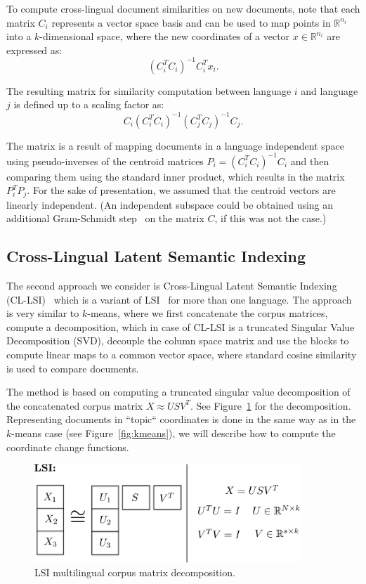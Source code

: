 \documentclass[twoside,11pt]{article}
\newcommand{\RR}{\mathbb{R}}
\begin{document}
To compute  cross-lingual document similarities on new documents, note that each matrix $C_i$ represents a vector space basis and can be used to map points in $\RR^{n_i}$ into a $k$-dimensional space, where the new coordinates of a vector $x \in \RR^{n_i}$ are expressed as: $$(C_i^T C_i)^{-1} C_i^T x_i.$$

The resulting matrix for similarity computation between language $i$ and language $j$ is defined up to a scaling factor as:
$$C_i(C_i^T C_i)^{-1} (C_j^T C_j)^{-1} C_j.$$

The matrix is a result of mapping documents in a language independent space using pseudo-inverses of the centroid matrices $P_i = (C_i^T C_i)^{-1} C_i$ and then comparing them using the standard inner product, which results in the matrix $P_i^T P_j$. For the sake of presentation, we assumed that the centroid vectors are linearly independent. (An independent subspace could be obtained using an additional Gram-Schmidt step~\cite{golub} on the matrix $C$, if this was not the case.)

\subsection{Cross-Lingual Latent Semantic Indexing}\label{sec:LSI}

The second approach we consider is Cross-Lingual Latent Semantic Indexing (CL-LSI)~\cite{cl_lsi} which is a variant of LSI~ for more than one language. The approach is very similar to $k$-means, where we first concatenate the corpus matrices, compute a decomposition, which in case of CL-LSI is a truncated Singular Value Decomposition (SVD), decouple the
 column space matrix and use the blocks to compute linear maps to a common vector space, where standard cosine similarity is used to compare documents.

 The method is based on computing a truncated singular value decomposition of the concatenated corpus matrix $X \approx U S V^T$. See Figure~\ref{fig:lsi} for the decomposition. Representing documents in ``topic`` coordinates is done in the same way as in the $k$-means case (see Figure~\ref{fig:kmeans}), we will describe how to compute the coordinate change functions.

\begin{figure}[tbp]
\centering
\includegraphics[width=10cm]{lsi.pdf}
\caption{\label{fig:lsi} LSI multilingual corpus matrix decomposition.}
\end{figure}
\end{document}
